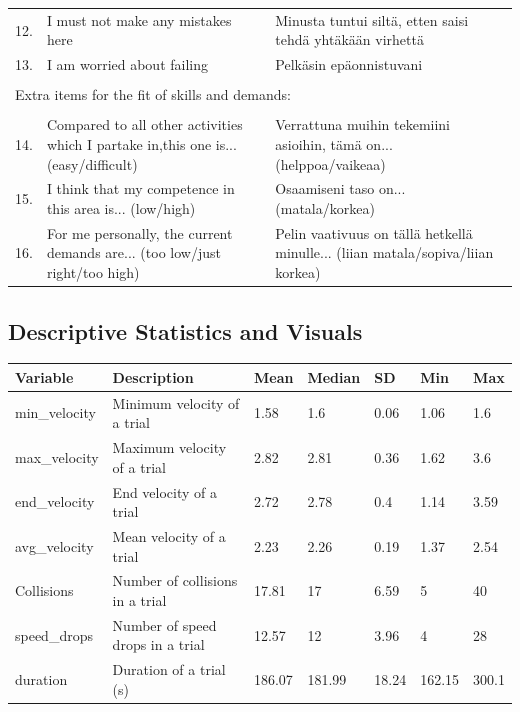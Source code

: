 \documentclass[fleqn,10pt]{wlscirep}
\begin{document}
\begin{minipage}{\textwidth}
\begin{tabular}{l p{} p{}}
12. & I must not make any mistakes here & Minusta tuntui silt\"{a}, etten saisi tehd\"{a} yht\"{a}k\"{a}\"{a}n virhett\"{a}\\
13. & I am worried about failing & Pelk\"{a}sin ep\"{a}onnistuvani\\
\\
\multicolumn{3}{l}{Extra items for the fit of skills and demands:} \\
\\
14. & Compared to all other activities which I partake in,this one is... (easy/difficult) & Verrattuna muihin tekemiini asioihin, t\"{a}m\"{a} on... (helppoa/vaikeaa) \\
15. & I think that my competence in this area is... (low/high)  & Osaamiseni taso on... (matala/korkea)\\
16. & For me personally, the current demands are... (too low/just right/too high) & Pelin vaativuus on t\"{a}ll\"{a} hetkell\"{a} minulle... (liian matala/sopiva/liian korkea)\\
\end{tabular}
\end{minipage}


\subsection*{Descriptive Statistics and Visuals}

\begin{minipage}{\textwidth}
\centering
{}
\begin{tabular}{lllllll}
\hline
Variable & Description & Mean & Median & SD & Min & Max \\
\hline
min\_velocity & Minimum velocity of a trial & 1.58 & 1.6 & 0.06 & 1.06 & 1.6 \\
max\_velocity & Maximum velocity of a trial & 2.82 & 2.81 & 0.36 & 1.62 & 3.6 \\
end\_velocity & End velocity of a trial & 2.72 & 2.78 & 0.4 & 1.14 & 3.59 \\
avg\_velocity & Mean velocity of a trial & 2.23 & 2.26 & 0.19 & 1.37 & 2.54 \\
Collisions & Number of collisions in a trial & 17.81 & 17 & 6.59 & 5 & 40 \\
speed\_drops & Number of speed drops in a trial & 12.57 & 12 & 3.96 & 4 & 28 \\
duration & Duration of a trial (s) & 186.07 & 181.99 & 18.24 & 162.15 & 300.1 \\
\hline
\end{tabular}
\end{minipage}
\end{document}
